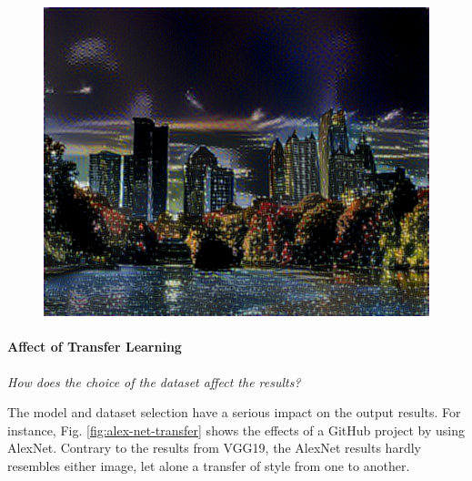 \documentclass{article}
\begin{document}
\begin{figure}[htp]
    \begin{minipage}{0.3\linewidth}
    \includegraphics[width=\textwidth]{img/photo-transfer/x}
    \end{minipage}
\end{figure}


\paragraph{Affect of Transfer Learning} \textit{How does the choice of the
dataset affect the results?}

The model and dataset selection have a serious impact on the output results.
For instance, Fig. \ref{fig:alex-net-transfer} shows the effects of a GitHub
project by \cite{alexnet-transfer} using AlexNet. Contrary to the results
from VGG19, the AlexNet results hardly resembles either image, let alone a
transfer of style from one to another.
\end{document}
